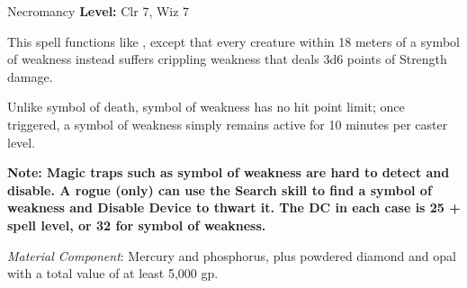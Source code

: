 {Necromancy}
{
	\textbf{Level:}
	Clr 7, Wiz 7\\
}
{
	This spell functions like , except that every creature within 18 meters of a symbol of weakness instead suffers crippling weakness that deals 3d6 points of Strength damage.

	Unlike symbol of death, symbol of weakness has no hit point limit; once triggered, a symbol of weakness simply remains active for 10 minutes per caster level.

	\textbf{Note: Magic traps such as symbol of weakness are hard to detect and disable. A rogue (only) can use the Search skill to find a symbol of weakness and Disable Device to thwart it. The DC in each case is 25 + spell level, or 32 for symbol of weakness.}

	\textit{Material Component}:
	Mercury and phosphorus, plus powdered diamond and opal with a total value of at least 5,000 gp.

}
